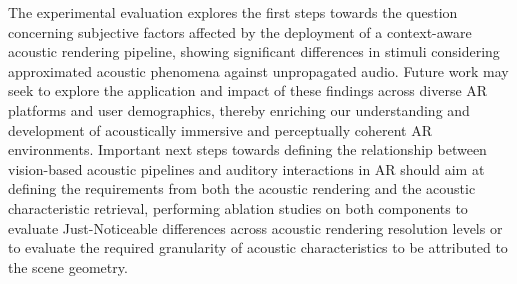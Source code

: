 The experimental evaluation explores the first steps towards the question concerning subjective factors affected by the deployment of a context-aware acoustic rendering pipeline, showing significant differences in stimuli considering approximated acoustic phenomena against unpropagated audio. Future work may seek to explore the application and impact of these findings across diverse AR platforms and user demographics, thereby enriching our understanding and development of acoustically immersive and perceptually coherent AR environments. Important next steps towards defining the relationship between vision-based acoustic pipelines and auditory interactions in AR should aim at defining the requirements from both the acoustic rendering and the acoustic characteristic retrieval, performing ablation studies on both components to evaluate Just-Noticeable differences across acoustic rendering resolution levels or to evaluate the required granularity of acoustic characteristics to be attributed to the scene geometry.
